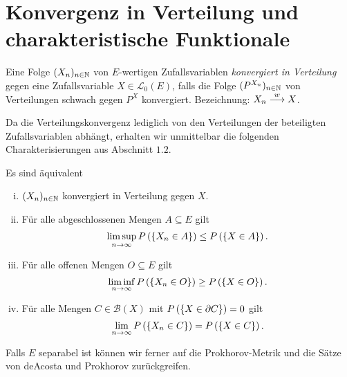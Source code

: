 \section{Konvergenz in Verteilung und charakteristische Funktionale}

\begin{mydef}
    Eine Folge $(X_n)_{n \in \mathbb{N}}$ von $E$-wertigen Zufallsvariablen \textit{konvergiert in Verteilung} gegen eine Zufallsvariable $X \in \mathcal{L}_0(E)$,
    falls die Folge $(P^{X_n})_{n \in \mathbb{N}}$ von Verteilungen schwach gegen $P^X$ konvergiert. 
    \newline 
    Bezeichnung: $X_n \overset{w}{\longrightarrow} X$. 
\end{mydef}

Da die Verteilungskonvergenz lediglich von den Verteilungen der beteiligten Zufallsvariablen abhängt, erhalten wir unmittelbar die folgenden Charakterisierungen aus Abschnitt $1.2$.
\begin{proposition}
    Es sind äquivalent
    \begin{enumerate}[(i)]
        \item $(X_n)_{n \in \mathbb{N}}$ konvergiert in Verteilung gegen $X$. 
        \item Für alle abgeschlossenen Mengen $A \subseteq E$ gilt 
        $$
            \limsup_{n \to \infty}P\left(\left\{ X_n \in A \right\}\right) \leq P\left(\left\{ X \in A \right\}\right).
        $$
        \item Für alle offenen Mengen $O \subseteq E$ gilt
        $$
            \liminf_{n \to \infty}P\left(\left\{ X_n \in O \right\}\right) \geq P\left(\left\{ X \in O \right\}\right).
        $$
        \item Für alle Mengen $C \in \mathcal{B}(X)$ mit $P\left(\left\{ X \in \partial C \right\}\right) = 0$ gilt 
        $$
            \lim_{n \to \infty}P\left(\left\{ X_n \in C \right\}\right) = P\left(\left\{ X \in C \right\}\right). 
        $$
    \end{enumerate}
\end{proposition}

Falls $E$ separabel ist können wir ferner auf die Prokhorov-Metrik und die Sätze von deAcosta und Prokhorov zurückgreifen.





